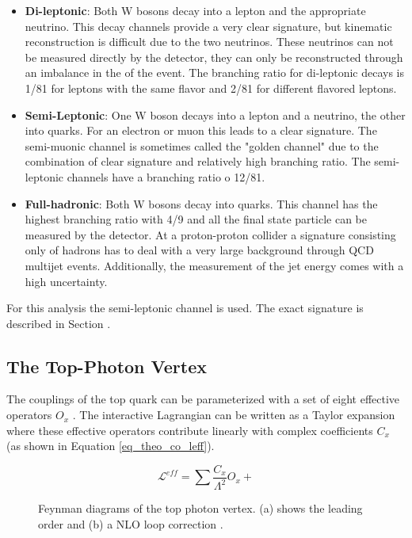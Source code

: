 \begin{itemize}
\item \textbf{Di-leptonic}: Both W bosons decay into a lepton and the appropriate neutrino. This decay channels provide a very clear signature, but kinematic reconstruction is difficult due to the two neutrinos. These neutrinos can not be measured directly by the detector, they can only be reconstructed through an imbalance in the \pt of the event. The branching ratio for di-leptonic decays is 1/81 for leptons with the same flavor and 2/81 for different flavored  leptons.
\item \textbf{Semi-Leptonic}: One W boson decays into a lepton and  a neutrino, the other into quarks. For an electron or muon this leads to a clear signature. The semi-muonic channel is sometimes called the "golden channel" due to the combination of clear signature and relatively high branching ratio. The semi-leptonic channels have a branching ratio o 12/81.
\item \textbf{Full-hadronic}: Both W bosons decay into quarks. This channel has the highest branching ratio with 4/9 and all the final state particle can be measured by the detector. At a proton-proton collider a signature consisting only of hadrons has to deal with a very large background through QCD multijet events. Additionally, the measurement of the jet energy comes with a high uncertainty.
\end{itemize}

For this analysis the semi-leptonic channel is used. The exact signature is described in Section .

\subsection{The Top-Photon Vertex}

The couplings of the top quark can be parameterized with a set of eight effective operators $O_x$ \cite{AguilarSaavedra:2008zc}. The interactive Lagrangian can be written as a Taylor expansion where these effective operators contribute linearly with complex coefficients $C_x$ (as shown in Equation \ref{eq_theo_co_leff}).

\begin{equation}
\mathcal{L}^{eff} = \sum{\frac{C_x}{\Lambda^2} O_x + }
\label{eq_theo_co_leff}
\end{equation}

\begin{figure}[ht]
  \caption{Feynman diagrams of the top photon vertex. (a) shows the leading order and (b) a NLO loop correction \cite{tholen:ma}. }
  \label{fig_theo_top_gamvert}
\end{figure}


